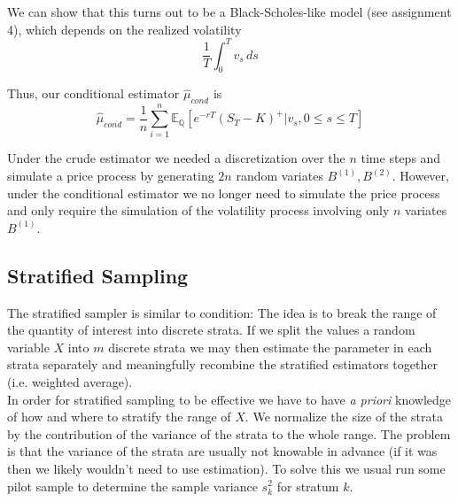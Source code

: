 \documentclass[12pt]{article}
\newlength\tindent
\renewcommand{\indent}{\hspace*{\tindent}}
\newcommand{\Q}{\mathbb Q}
\newcommand{\E}{\mathbb E}
\begin{document}
\indent We can show that this turns out to be a Black-Scholes-like model (see assignment 4), which depends on the realized volatility
\begin{equation*}
	\frac{1}{T} \int^T_0 v_s\,ds
\end{equation*}

Thus, our conditional estimator $\hat{\mu}_{cond}$ is
\begin{equation*}
	\hat{\mu}_{cond} = \frac{1}{n} \sum^n_{i = 1} \E_\Q \left[ e^{-rT} \left(S_T - K\right)^+ | v_s, 0 \leq s \leq T \right]
\end{equation*}	

\indent Under the crude estimator we needed a discretization over the $n$ time steps and simulate a price process by generating $2n$ random variates $B^{(1)}, B^{(2)}$. However, under the conditional estimator we no longer need to simulate the price process and only require the simulation of the volatility process involving only $n$ variates $B^{(1)}$.

\subsection{Stratified Sampling}

\indent The stratified sampler is similar to condition: The idea is to break the range of the quantity of interest into discrete strata. If we split the values a random variable $X$ into $m$ discrete strata we may then estimate the parameter in each strata separately and meaningfully recombine the stratified estimators together (i.e. weighted average). \\

\indent In order for stratified sampling to be effective we have to have {\em a priori} knowledge of how and where to stratify the range of $X$. We normalize the size of the strata by the contribution of the variance of the strata to the whole range. The problem is that the variance of the strata are usually not knowable in advance (if it was then we likely wouldn't need to use estimation). To solve this we usual run some pilot sample to determine the sample variance $s_k^2$ for stratum $k$.
\end{document}
